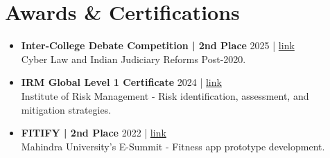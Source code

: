 \documentclass[a4paper,10pt]{article}
\newcommand{\resumeAward}[4]{\item
  \textbf{#1} \hfill #3 | \href{#4}{link} \\
  #2 \vspace{-1mm}
}
\begin{document}
\section{\textbf{Awards \& Certifications}}
\begin{itemize}[leftmargin=*,itemsep=1mm]
\resumeAward{Inter-College Debate Competition | 2nd Place}
{Cyber Law and Indian Judiciary Reforms Post-2020.}
{2025}
{https://drive.google.com/file/d/11uASYH2UqavtXNcwyxmgaJoMjOUqwSY0/view?usp=sharing}

\resumeAward{IRM Global Level 1 Certificate}
{Institute of Risk Management - Risk identification, assessment, and mitigation strategies.}
{2024}
{https://drive.google.com/file/d/1bQqinD-PEgxwXxF4pJlvSC022TX1KDnj/view?usp=sharing}

\resumeAward{FITIFY | 2nd Place}
{Mahindra University's E-Summit - Fitness app prototype development.}
{2022}
{https://drive.google.com/file/d/15pDKqMnI5vn3K-LuLI3v0hInWTLnmQs-/view?usp=sharing}
\end{itemize}
\end{document}
